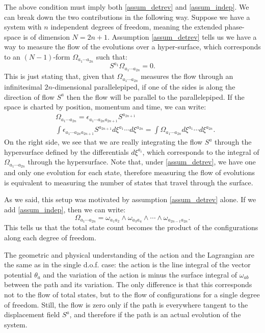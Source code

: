 The above condition must imply both \ref{assum_detrev} and \ref{assum_indep}. We can break down the two contributions in the following way. Suppose we have a system with $n$ independent degrees of freedom, meaning the extended phase-space is of dimension $N=2n+1$. Assumption \ref{assum_detrev} tells us we have a way to measure the flow of the evolutions over a hyper-surface, which corresponds to an $(N-1)$-form $\Omega_{a_1 \cdots a_{2n}}$ such that:
\begin{equation}
	S^{a_1} \Omega_{a_1 \cdots a_{2n}} = 0.
\end{equation}
This is just stating that, given that $\Omega_{a_1 \cdots a_{2n}}$ measures the flow through an infinitesimal $2n$-dimensional parallelepiped, if one of the sides is along the direction of flow $S^a$ then the flow will be parallel to the parallelepiped. If the space is charted by position, momentum and time, we can write:
\begin{equation}
	\begin{aligned}
	&\Omega_{a_1 \cdots a_{2n}} = \epsilon_{a_1 \cdots a_{2n}a_{2n+1}} S^{a_{2n+1}} \\
	&\int \epsilon_{a_1 \cdots a_{2n}a_{2n+1}} S^{a_{2n+1}} d\xi^{a_1}\cdots d\xi^{a_{2n}} = \int \Omega_{a_1 \cdots a_{2n}} d\xi^{a_1}\cdots d\xi^{a_{2n}}.
	\end{aligned}
\end{equation}
On the right side, we see that we are really integrating the flow $S^a$ through the hypersurface defined by the differentials $d\xi^{a_i}$, which corresponds to the integral of $\Omega_{a_1 \cdots a_{2n}}$ through the hypersurface. Note that, under \ref{assum_detrev}, we have one and only one evolution for each state, therefore measuring the flow of evolutions is equivalent to measuring the number of states that travel through the surface.

As we said, this setup was motivated by assumption \ref{assum_detrev} alone. If we add \ref{assum_indep}, then we can write:
\begin{equation}
	\Omega_{a_1 \cdots a_{2n}} = \omega_{a_1 a_2} \wedge \omega_{a_3 a_4} \wedge \cdots \wedge \omega_{a_{2n-1} a_{2n}}.
\end{equation}
This tells us that the total state count becomes the product of the configurations along each degree of freedom.

The geometric and physical understanding of the action and the Lagrangian are the same as in the single d.o.f. case: the action is the line integral of the vector potential $\theta_a$ and the variation of the action is minus the surface integral of $\omega_{ab}$ between the path and its variation. The only difference is that this corresponds not to the flow of total states, but to the flow of configurations for a single degree of freedom. Still, the flow is zero only if the path is everywhere tangent to the displacement field $S^a$, and therefore if the path is an actual evolution of the system.

